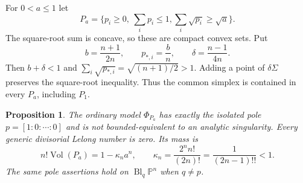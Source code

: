 \documentclass[11pt]{article}
\newtheorem{proposition}[theorem]{Proposition}
\newcommand{\Vol}{\operatorname{Vol}}
\newcommand{\CP}{\mathbb P}
\begin{document}
For $0<a\le1$ let
\[
 P_a=\{p_i\ge0,\ \textstyle\sum_i p_i\le1,
                      \textstyle\sum_i\sqrt{p_i}\ge\sqrt a\}.
\]
The square-root sum is concave, so these are compact convex sets.
Put
\[
 b=\frac{n+1}{2n},\qquad p_{*,i}=\frac bn,
 \qquad\delta=\frac{n-1}{4n}.
\]
Then $b+\delta<1$ and $\sum_i\sqrt{p_{*,i}}=\sqrt{(n+1)/2}>1$.
Adding a point of $\delta\Sigma$ preserves the square-root inequality.
Thus the common simplex is contained in every $P_a$, including $P_1$.

\begin{proposition}\label{prop:nonanalytic}
The ordinary model $\Phi_{P_a}$ has exactly the isolated pole
$p=[1:0:\cdots:0]$ and is not bounded-equivalent to an analytic
singularity. Every generic divisorial Lelong number is zero. Its mass is
\[
 n!\Vol(P_a)=1-\kappa_n a^n,\qquad
 \kappa_n=\frac{2^n n!}{(2n)!}=\frac1{(2n-1)!!}<1.
\]
The same pole assertions hold on $\operatorname{Bl}_q\CP^n$ when $q\ne p$.
\end{proposition}
\end{document}
